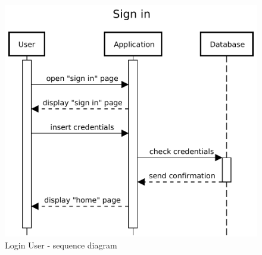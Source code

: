 \begin{figure}[H]
    \centering
    \includegraphics[scale=0.5]{Images/Sequence diagrams/User - sign in.pdf}

    \caption{Login User - sequence diagram}
    \label{fig:fig:seq_diag_sign_in}
\end{figure}

